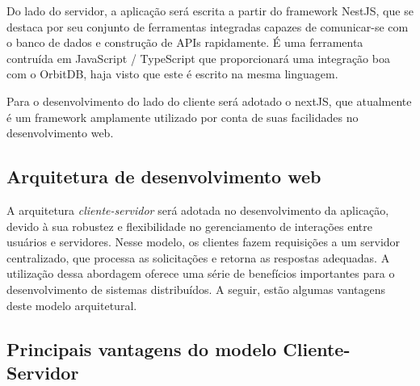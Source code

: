 Do lado do servidor, a aplicação será escrita a partir do framework NestJS, que se destaca por seu conjunto de ferramentas integradas capazes de comunicar-se com o banco de dados e construção de APIs rapidamente. É uma ferramenta contruída em JavaScript / TypeScript que proporcionará uma integração boa com o OrbitDB, haja visto que este é escrito na mesma linguagem.

Para o desenvolvimento do lado do cliente será adotado o nextJS, que atualmente é um framework amplamente utilizado por conta de suas facilidades no desenvolvimento web.

\subsection{Arquitetura de desenvolvimento web}

A arquitetura \textit{cliente-servidor} será adotada no desenvolvimento da aplicação, devido à sua robustez e flexibilidade no gerenciamento de interações entre usuários e servidores. Nesse modelo, os clientes fazem requisições a um servidor centralizado, que processa as solicitações e retorna as respostas adequadas. A utilização dessa abordagem oferece uma série de benefícios importantes para o desenvolvimento de sistemas distribuídos. A seguir, estão algumas vantagens deste modelo arquitetural.

\subsection{Principais vantagens do modelo Cliente-Servidor}


